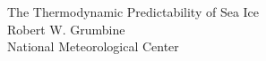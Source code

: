 \textwidth=6.5in
\oddsidemargin=-0.5in
\renewcommand{\baselinestretch}{2.0}

\begin{center}

\LARGE{The Thermodynamic Predictability of Sea Ice}\\
\Large{Robert W. Grumbine}                           \\
\Large{National Meteorological Center}

\end{center}


